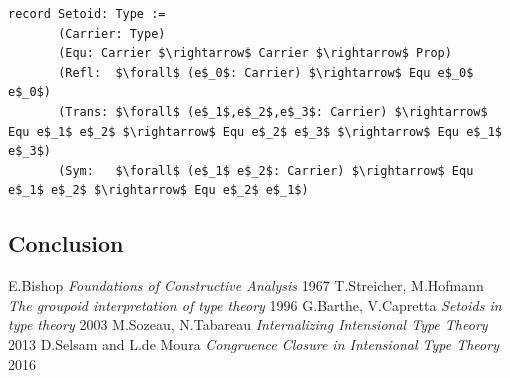 \documentclass[11pt,oneside]{article}
\begin{document}
\begin{lstlisting}[mathescape=true]
record Setoid: Type :=
       (Carrier: Type)
       (Equ: Carrier $\rightarrow$ Carrier $\rightarrow$ Prop)
       (Refl:  $\forall$ (e$_0$: Carrier) $\rightarrow$ Equ e$_0$ e$_0$)
       (Trans: $\forall$ (e$_1$,e$_2$,e$_3$: Carrier) $\rightarrow$ Equ e$_1$ e$_2$ $\rightarrow$ Equ e$_2$ e$_3$ $\rightarrow$ Equ e$_1$ e$_3$)
       (Sym:   $\forall$ (e$_1$ e$_2$: Carrier) $\rightarrow$ Equ e$_1$ e$_2$ $\rightarrow$ Equ e$_2$ e$_1$)
\end{lstlisting}

\subsection{Conclusion}

\begin{thebibliography}{9}

 E.Bishop \textit{Foundations of Constructive Analysis} 1967
 T.Streicher, M.Hofmann  \textit{The groupoid interpretation of type theory} 1996
 G.Barthe, V.Capretta \textit{Setoids in type theory} 2003
 M.Sozeau, N.Tabareau \textit{Internalizing Intensional Type Theory} 2013
 D.Selsam and L.de Moura \textit{Congruence Closure in Intensional Type Theory} 2016
\end{thebibliography}
\end{document}
